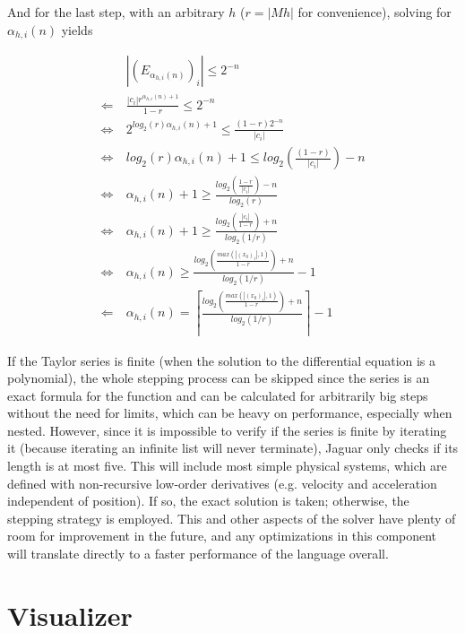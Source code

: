 And for the last step, with an arbitrary $h$ ($r = |Mh|$ for convenience), solving for $\alpha_{h,i}(n)$ yields

\begin{equation}
\label{eq:solver_step_delta}
  \begin{split}
    & |(E_{\alpha_{h,i}(n)})_i| \leq 2^{-n} \\
    \Leftarrow\ & \frac{|c_i| r^{\alpha_{h,i}(n)+1}}{1-r} \leq 2^{-n} \\
    \Leftrightarrow\ & 2^{log_2(r)\alpha_{h,i}(n)+1} \leq \frac{(1-r) 2^{-n}}{|c_i|} \\
    \Leftrightarrow\ & log_2(r)\alpha_{h,i}(n)+1 \leq log_2 \left( \frac{(1-r)}{|c_i|} \right) -n \\
    \Leftrightarrow\ & \alpha_{h,i}(n)+1 \geq \frac{log_2 \left( \frac{1-r}{|c_i|} \right) -n}{log_2(r)} \\
    \Leftrightarrow\ & \alpha_{h,i}(n)+1 \geq \frac{log_2 \left( \frac{|c_i|}{1-r} \right) +n}{log_2(1/r)} \\
    \Leftrightarrow\ & \alpha_{h,i}(n) \geq \frac{log_2 \left( \frac{max(|(x_0)_i|,1)}{1-r} \right) +n}{log_2(1/r)} - 1 \\
    \Leftarrow\ & \alpha_{h,i}(n) = \left\lceil \frac{log_2 \left( \frac{max(|(x_0)_i|,1)}{1-r} \right) +n}{log_2(1/r)} \right\rceil - 1
  \end{split}
\end{equation}

If the Taylor series is finite (when the solution to the differential equation is a polynomial), the whole stepping process can be skipped since the series is an exact formula for the function and can be calculated for arbitrarily big steps without the need for limits, which can be heavy on performance, especially when nested. However, since it is impossible to verify if the series is finite by iterating it (because iterating an infinite list will never terminate), Jaguar only checks if its length is at most five. This will include most simple physical systems, which are defined with non-recursive low-order derivatives (e.g. velocity and acceleration independent of position). If so, the exact solution is taken; otherwise, the stepping strategy is employed. This and other aspects of the solver have plenty of room for improvement in the future, and any optimizations in this component will translate directly to a faster performance of the language overall.

\pagebreak


\section{Visualizer}
\label{sec:visualizer}


